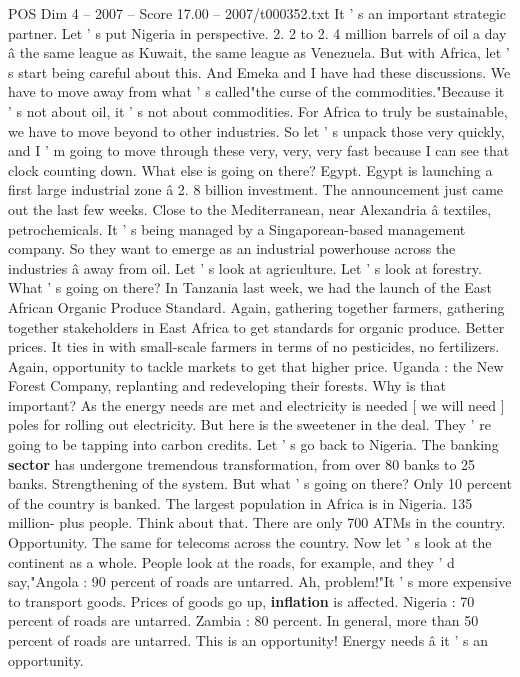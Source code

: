 \begin{textsample}{POS Dim 4 – 2007 – Score 17.00 – 2007/t000352.txt}
It ' s an important strategic partner.
Let ' s put Nigeria in perspective. 2. 2 to 2. 4 million barrels of oil a day â the same league as Kuwait, the same league as Venezuela.
But with Africa, let ' s start being careful about this.
And Emeka and I have had these discussions.
We have to move away from what ' s called"the curse of the commodities."Because it ' s not about oil, it ' s not about commodities.
For Africa to truly be sustainable, we have to move beyond to other industries.
So let ' s unpack those very quickly, and I ' m going to move through these very, very, very fast because I can see that clock counting down.
What else is going on there?
Egypt.
Egypt is launching a first large industrial zone â 2. 8 billion investment.
The announcement just came out the last few weeks.
Close to the Mediterranean, near Alexandria â textiles, petrochemicals.
It ' s being managed by a Singaporean-based management company.
So they want to emerge as an industrial powerhouse across the industries â away from oil.
Let ' s look at agriculture.
Let ' s look at forestry.
What ' s going on there?
In Tanzania last week, we had the launch of the East African Organic Produce Standard.
Again, gathering together farmers, gathering together stakeholders in East Africa to get standards for organic produce.
Better prices.
It ties in with small-scale farmers in terms of no pesticides, no fertilizers.
Again, opportunity to tackle markets to get that higher price.
Uganda : the New Forest Company, replanting and redeveloping their forests.
Why is that important?
As the energy needs are met and electricity is needed [ we will need ] poles for rolling out electricity.
But here is the sweetener in the deal.
They ' re going to be tapping into carbon credits.
Let ' s go back to Nigeria.
The banking \textbf{sector} has undergone tremendous transformation, from over 80 banks to 25 banks.
Strengthening of the system.
But what ' s going on there?
Only 10 percent of the country is banked.
The largest population in Africa is in Nigeria. 135 million- plus people.
Think about that.
There are only 700 ATMs in the country.
Opportunity.
The same for telecoms across the country.
Now let ' s look at the continent as a whole.
People look at the roads, for example, and they ' d say,"Angola : 90 percent of roads are untarred.
Ah, problem!"It ' s more expensive to transport goods.
Prices of goods go up, \textbf{inflation} is affected.
Nigeria : 70 percent of roads are untarred.
Zambia : 80 percent.
In general, more than 50 percent of roads are untarred.
This is an opportunity!
Energy needs â it ' s an opportunity.

\end{textsample}
